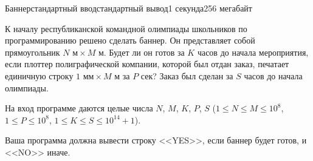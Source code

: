 \begin{problem}{Баннер}{стандартный ввод}{стандартный вывод}{1 секунда}{256 мегабайт}

К началу республиканской командной олимпиады школьников по программированию решено сделать баннер. Он представляет собой прямоугольник $N \mbox{ м} \times M \mbox{ м}$. Будет ли он готов за $K$ часов до начала мероприятия, если плоттер полиграфической компании, которой был отдан заказ, печатает единичную строку $1 \mbox{ мм} \times M \mbox{ м}$ за $P$ сек? Заказ был сделан за $S$ часов до начала олимпиады.

\InputFile
На вход программе даются целые числа $N$, $M$, $K$, $P$, $S$ ($1 \le N \le M \le 10^8$, $1 \le P \le 10^8$, $1 \le K \le S \le 10^{14} + 1$).

\OutputFile
Ваша программа должна вывести строку <<YES>>, если баннер будет готов, и <<NO>> иначе.

\Examples

\begin{example}
%
%
\end{example}

\end{problem}

